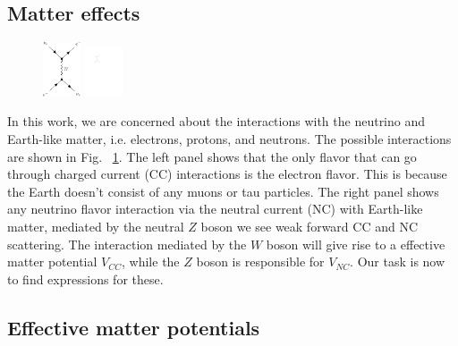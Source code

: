 \documentclass[draft=True]{revtex4-2}
\begin{document}
\subsection{Matter effects}
\begin{figure}\label{fig:w_and_z}
    \includegraphics[width=0.1\textwidth]{figures/w-boson.pdf}
    \hspace{2cm}
    \includegraphics[width=0.1\textwidth]{figures/z-boson.pdf}
\end{figure}
In this work, we are concerned about the interactions with the neutrino and Earth-like matter, i.e. electrons, protons, and neutrons. 
The possible interactions are shown in Fig. ~\ref{fig:w_and_z}. The left panel shows that the only flavor that can go through charged current (CC) 
interactions is the electron flavor. This is because the Earth doesn't consist of any muons or tau particles. 
The right panel shows any neutrino flavor interaction via the neutral current (NC) with Earth-like matter, mediated by the neutral $Z$ boson
 we see weak forward CC and NC scattering. 
The interaction mediated by the $W$ boson will give rise to a effective matter potential $V_{CC}$, while
the $Z$ boson is responsible for $V_{NC}$. Our task is now to find expressions for these.

\subsection{Effective matter potentials}
\end{document}
